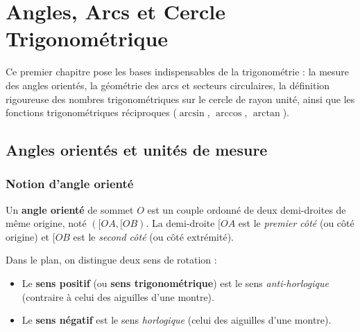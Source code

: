 \chapter{Angles, Arcs et Cercle Trigonométrique}

Ce premier chapitre pose les bases indispensables de la trigonométrie : la mesure des angles orientés, la géométrie des arcs et secteurs circulaires, la définition rigoureuse des nombres trigonométriques sur le cercle de rayon unité, ainsi que les fonctions trigonométriques réciproques ($\arcsin$, $\arccos$, $\arctan$).

\section{Angles orientés et unités de mesure}

\subsection{Notion d'angle orienté}

\begin{definition}
Un \textbf{angle orienté} de sommet $O$ est un couple ordonné de deux demi-droites de même origine, noté $([OA, [OB)$. La demi-droite $[OA$ est le \emph{premier côté} (ou côté origine) et $[OB$ est le \emph{second côté} (ou côté extrémité).

Dans le plan, on distingue deux sens de rotation :
\begin{itemize}
    \item Le \textbf{sens positif} (ou \textbf{sens trigonométrique}) est le sens \emph{anti-horlogique} (contraire à celui des aiguilles d'une montre).
    \item Le \textbf{sens négatif} est le sens \emph{horlogique} (celui des aiguilles d'une montre).
\end{itemize}
\end{definition}

